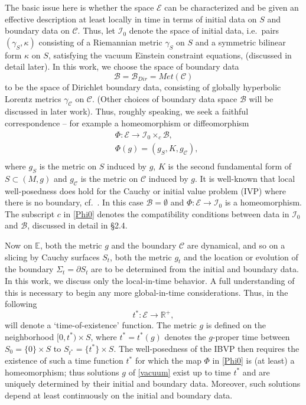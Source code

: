 \documentclass[10pt]{amsart}
\newcommand{\g}{\gamma}
\newcommand{\Si}{\Sigma}
\renewcommand{\k}{\kappa}
\newcommand{\cC}{{\mathcal C}}
\newcommand{\cB}{{\mathcal B}}
\newcommand{\cE}{{\mathcal E}}
\newcommand{\cI}{\mathcal I}
\newcommand{\bR}{\mathbb R}
\newcommand{\bE}{\mathbb E}
\newcommand{\be}{\begin{equation}}
\newcommand{\ee}{\end{equation}}
\newcommand{\p}{\partial}
\renewcommand{\to}{\rightarrow}
\newcommand{\<}{\langle}
\renewcommand{\>}{\rangle}
\theoremstyle{plain}
\theoremstyle{remark}
\theoremstyle{definition}
\numberwithin{equation}{section}
\begin{document}
  The basic issue here is whether the space $\cE$ can be characterized and be given an effective description at least locally in time  in terms of 
initial data on $S$ and boundary data on $\cC$. Thus, let $\cI_0$ denote the space of initial data, i.e.~pairs $(\g_S, \k)$ consisting of a Riemannian 
metric $\g_S$ on $S$ and a symmetric bilinear form $\k$ on $S$, satisfying the vacuum Einstein constraint equations, (discussed in detail later). 
In this work, we choose the space of boundary data 
$$\cB = \cB_{Dir} = Met(\cC)$$
to be the space of Dirichlet boundary data, consisting of globally hyperbolic Lorentz metrics $\g_{\cC}$ on $\cC$. (Other choices of boundary data space 
$\cB$ will be discussed in later work). Thus, roughly speaking, we seek a faithful correspondence -- for example a homeomorphism or diffeomorphism 
\be \label{Phi0}
\begin{split}
&\Phi: \cE \to \cI_0 \times_c \cB,\\
&\Phi(g) = (g_S, K, g_{\cC}), \\
\end{split}
\ee
where $g_S$ is the metric on $S$ induced by $g$, $K$ is the second fundamental form of $S \subset (M, g)$ and $g_{\cC}$ is the metric on $\cC$ induced 
by $g$. It is well-known that local well-posedness does hold for the Cauchy or initial value problem (IVP) where there is no boundary, cf.~\cite{C}. In this 
case $\cB = \emptyset$ and $\Phi: \cE \to \cI_0$ is a homeomorphism. The subscript $c$ in \eqref{Phi0} denotes the compatibility conditions between 
data in $\cI_0$ and $\cB$, discussed in detail in \S 2.4. 

  Now on $\bE$, both the metric $g$ and the boundary $\cC$ are dynamical, and so on a slicing by Cauchy surfaces $S_t$, both the metric $g_t$ and 
the location or evolution of the boundary $\Si_t = \p S_t$ are to be determined from the initial and boundary data. In this work, we discuss only the 
local-in-time behavior. A full understanding of this is necessary to begin any more global-in-time considerations. Thus, in the following 
$$t^*: \cE \to \bR^+,$$
will denote a `time-of-existence' function. The metric $g$ is defined on the neighborhood $[0, t^*)\times S$, where $t^* = t^*(g)$ denotes the $g$-proper time 
between $S_0 = \{0\}\times S$ to $S_{t^*} = \{t^*\}\times S$. The well-posedness of the IBVP then requires the existence of such a time function 
$t^*$ for which the map $\Phi$ in \eqref{Phi0} is (at least) a homeomorphism; thus solutions $g$ of \eqref{vacuum} exist up to time $t^*$ and are 
uniquely determined by their initial and boundary data. Moreover, such solutions depend at least continuously on the initial and boundary data. 
\end{document}
